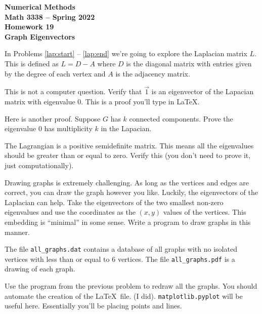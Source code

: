 \documentclass[11pt,letterpaper]{article}
\newcommand{\semester}{Spring 2022}
\begin{document}
\begin{center}
{\huge{\bf  Numerical Methods}} \\[1.5ex]
{\bf Math 3338 -- \semester}\\[1.5ex]
{\Large{\bf Homework 19\ \\[2ex] Graph Eigenvectors}}\\
\end{center}
\vspace{2mm}








In Problems \ref{lap:start} -- \ref{lap:end} we're going to explore the Laplacian matrix $L$.
This is defined as $L = D-A$ where $D$ is the diagonal matrix with entries given by the degree
of each vertex and $A$ is the adjacency matrix.



\begin{problem}
\label{lap:start}
 This is not a computer question. Verify that $\vec{1}$ is an eigenvector of the Lapacian matrix
with eigenvalue $0$. This is a proof you'll type in \LaTeX.
\end{problem}

\begin{problem}
 Here is another proof. Suppose $G$ has $k$ connected components. Prove the eigenvalue $0$ has
multiplicity $k$ in the Lapacian.
\end{problem}

\begin{problem}
The Lagrangian is a positive semidefinite matrix. This means all the eigenvalues should be greater
than or equal to zero. Verify this (you don't need to prove it, just computationally).
\end{problem}


\begin{problem}
Drawing graphs is extremely challenging. As long as the vertices and edges are correct, you can draw
the graph however you like. Luckily, the eigenvectors of the Laplacian can help. Take the eigenvectors
of the two smallest non-zero eigenvalues and use the coordinates as the $(x,y)$ values of the 
vertices. This embedding is ``minimal'' in some sense. Write a program to draw graphs in this manner. 
\end{problem}

\begin{problem}
\label{lap:end}

The file \texttt{all\_graphs.dat} contains a database of all graphs with no isolated vertices 
with less than or equal to $6$ vertices. The file \texttt{all\_graphs.pdf} is a drawing of each
graph.

Use the program from the previous problem to redraw all the graphs. You should automate the creation
of the \LaTeX\ file. (I did). \texttt{matplotlib.pyplot} will be useful here. Essentially you'll be placing points and lines.
\end{problem}
\end{document}
